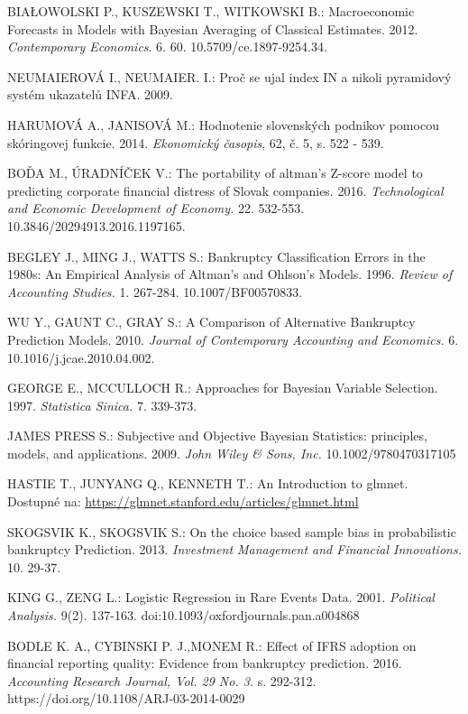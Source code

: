 \begin{thebibliography}{99}
     BIAŁOWOLSKI P., KUSZEWSKI T., WITKOWSKI B.: Macroeconomic Forecasts in Models with Bayesian Averaging of Classical Estimates.
    2012. \emph{Contemporary Economics}. 6. 60. 10.5709/ce.1897-9254.34.

     NEUMAIEROVÁ I., NEUMAIER. I.: Proč se ujal index IN a nikoli pyramidový systém ukazatelů INFA. 2009.

     HARUMOVÁ A., JANISOVÁ M.: Hodnotenie slovenských podnikov pomocou skóringovej funkcie. 2014. \emph{Ekonomický časopis}, 62, č. 5, s. 522 - 539.

     BOĎA M., ÚRADNÍČEK V.: The portability of altman’s Z-score model to predicting corporate financial distress of Slovak companies. 2016.
    \emph{Technological and Economic Development of Economy.} 22. 532-553. 10.3846/20294913.2016.1197165.

     BEGLEY J., MING J., WATTS S.: Bankruptcy Classification Errors in the 1980s: An Empirical Analysis of Altman's and Ohlson's Models.
    1996. \emph{Review of Accounting Studies.} 1. 267-284. 10.1007/BF00570833.

     WU Y., GAUNT C., GRAY S.: A Comparison of Alternative Bankruptcy Prediction Models. 
    2010. \emph{Journal of Contemporary Accounting and Economics.} 6. 10.1016/j.jcae.2010.04.002.

     GEORGE E., MCCULLOCH R.: Approaches for Bayesian Variable Selection. 1997. \emph{Statistica Sinica.} 7. 339-373.

     JAMES PRESS S.: Subjective and Objective Bayesian Statistics: principles, models, and applications. 2009. \emph{John Wiley \& Sons, Inc.} 10.1002/9780470317105

     HASTIE T., JUNYANG Q., KENNETH T.: An Introduction to glmnet. Dostupné na: \url{https://glmnet.stanford.edu/articles/glmnet.html}

     SKOGSVIK K., SKOGSVIK S.: On the choice based sample bias in probabilistic bankruptcy Prediction. 2013.
    \emph{Investment Management and Financial Innovations.} 10. 29-37.

     KING G., ZENG L.: Logistic Regression in Rare Events Data. 2001. \emph{Political Analysis.} 9(2). 137-163. doi:10.1093/oxfordjournals.pan.a004868
    
      BODLE K. A., CYBINSKI P. J.,MONEM R.: Effect of IFRS adoption on financial reporting quality: Evidence from bankruptcy prediction.
    2016. \emph{Accounting Research Journal, Vol. 29 No. 3.} s. 292-312. https://doi.org/10.1108/ARJ-03-2014-0029


\end{thebibliography}
